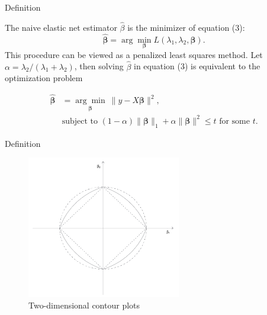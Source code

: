 \begin{frame}{Definition}

The naive elastic net estimator $\hat{\beta}$ is the minimizer of equation (3):
\begin{equation}
\hat{\bm{\beta}} = \arg\min_{\bm{\beta}} L(\lambda_1, \lambda_2, \bm{\beta}).
\end{equation}
This procedure can be viewed as a penalized least squares method. Let $\alpha = \lambda_2 / (\lambda_1 + \lambda_2)$, then solving $\hat{\beta}$ in equation (3) is equivalent to the optimization problem

\vspace{10pt}

\begin{equation}
\begin{aligned}
\hat{\bm{\beta}} &= \underset{\bm{\beta}}{\arg\min} \ \|y - X\bm{\beta}\|^2, \\
&\text{subject to } (1 - \alpha) \|\bm{\beta}\|_1 + \alpha \|\bm{\beta}\|^2 \leq t \text{ for some } t.
\end{aligned}
\end{equation}

\end{frame}


    \begin{frame}{Definition}
        \begin{figure}
            \centering
            \includegraphics[width=0.6\textwidth]{img/image1.png}
            \caption{Two-dimensional contour plots}
            \label{fig:enter-label}
        \end{figure}
    \end{frame}

